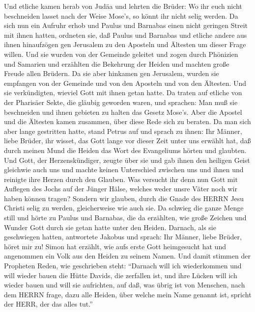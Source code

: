  Und etliche kamen herab von Judäa und lehrten die Brüder:
Wo ihr euch nicht beschneiden lasset nach der Weise Mose's, so könnt ihr
nicht selig werden.  Da sich nun ein Aufruhr erhob und
Paulus und Barnabas einen nicht geringen Streit mit ihnen hatten,
ordneten sie, daß Paulus und Barnabas und etliche andere aus ihnen
hinaufzögen gen Jerusalem zu den Aposteln und Ältesten um dieser Frage
willen.  Und sie wurden von der Gemeinde geleitet und zogen
durch Phönizien und Samarien und erzählten die Bekehrung der Heiden und
machten große Freude allen Brüdern.  Da sie aber hinkamen
gen Jerusalem, wurden sie empfangen von der Gemeinde und von den
Aposteln und von den Ältesten. Und sie verkündigten, wieviel Gott mit
ihnen getan hatte.  Da traten auf etliche von der Pharisäer
Sekte, die gläubig geworden waren, und sprachen: Man muß sie beschneiden
und ihnen gebieten zu halten das Gesetz Mose's.  Aber die
Apostel und die Ältesten kamen zusammen, über diese Rede sich zu
beraten.  Da man sich aber lange gestritten hatte, stand
Petrus auf und sprach zu ihnen: Ihr Männer, liebe Brüder, ihr wisset,
das Gott lange vor dieser Zeit unter uns erwählt hat, daß durch meinen
Mund die Heiden das Wort des Evangeliums hörten und glaubten.
 Und Gott, der Herzenskündiger, zeugte über sie und gab
ihnen den heiligen Geist gleichwie auch uns  und machte
keinen Unterschied zwischen uns und ihnen und reinigte ihre Herzen durch
den Glauben.  Was versucht ihr denn nun Gott mit Auflegen
des Jochs auf der Jünger Hälse, welches weder unsre Väter noch wir haben
können tragen?  Sondern wir glauben, durch die Gnade des
HERRN Jesu Christi selig zu werden, gleicherweise wie auch sie.
 Da schwieg die ganze Menge still und hörte zu Paulus und
Barnabas, die da erzählten, wie große Zeichen und Wunder Gott durch sie
getan hatte unter den Heiden.  Darnach, als sie geschwiegen
hatten, antwortete Jakobus und sprach: Ihr Männer, liebe Brüder, höret
mir zu!  Simon hat erzählt, wie aufs erste Gott heimgesucht
hat und angenommen ein Volk aus den Heiden zu seinem Namen.
 Und damit stimmen der Propheten Reden, wie geschrieben
steht:  ``Darnach will ich wiederkommen und will wieder
bauen die Hütte Davids, die zerfallen ist, und ihre Lücken will ich
wieder bauen und will sie aufrichten,  auf daß, was übrig
ist von Menschen, nach dem HERRN frage, dazu alle Heiden, über welche
mein Name genannt ist, spricht der HERR, der das alles tut.''
